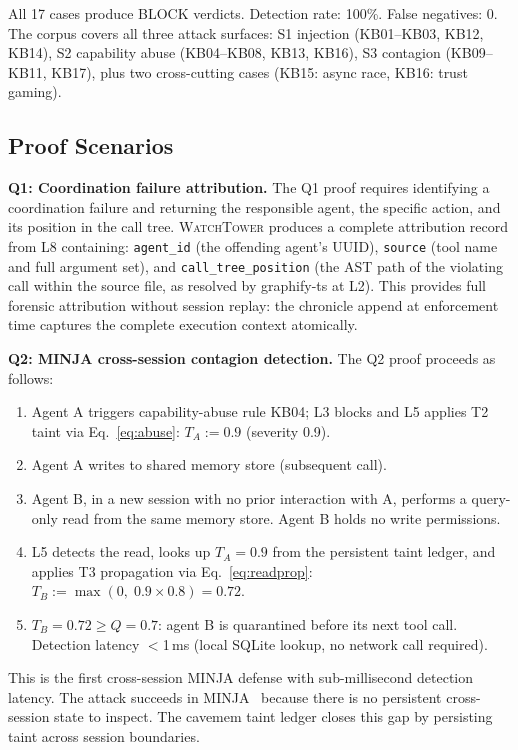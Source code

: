 \documentclass[conference]{IEEEtran}
\begin{document}
All 17 cases produce BLOCK verdicts. Detection rate: 100\%. False
negatives: 0. The corpus covers all three attack surfaces: S1 injection
(KB01--KB03, KB12, KB14), S2 capability abuse (KB04--KB08, KB13, KB16),
S3 contagion (KB09--KB11, KB17), plus two cross-cutting cases
(KB15: async race, KB16: trust gaming).

\subsection{Proof Scenarios}

\textbf{Q1: Coordination failure attribution.}
The Q1 proof requires identifying a coordination failure and returning the
responsible agent, the specific action, and its position in the call tree.
\textsc{WatchTower} produces a complete attribution record from L8
containing: \texttt{agent\_id} (the offending agent's UUID),
\texttt{source} (tool name and full argument set), and
\texttt{call\_tree\_position} (the AST path of the violating call within
the source file, as resolved by graphify-ts at L2). This provides full
forensic attribution without session replay: the chronicle append at
enforcement time captures the complete execution context atomically.

\textbf{Q2: MINJA cross-session contagion detection.}
The Q2 proof proceeds as follows:

\begin{enumerate}
\item Agent A triggers capability-abuse rule KB04; L3 blocks and L5
      applies T2 taint via Eq.~\ref{eq:abuse}: $T_A := 0.9$ (severity 0.9).
\item Agent A writes to shared memory store (subsequent call).
\item Agent B, in a new session with no prior interaction with A,
      performs a query-only read from the same memory store.
      Agent B holds no write permissions.
\item L5 detects the read, looks up $T_A = 0.9$ from the persistent
      taint ledger, and applies T3 propagation via Eq.~\ref{eq:readprop}:
      $T_B := \max(0,\; 0.9 \times 0.8) = 0.72$.
\item $T_B = 0.72 \geq Q = 0.7$: agent B is quarantined before its next
      tool call. Detection latency $<$1\,ms (local SQLite lookup,
      no network call required).
\end{enumerate}

This is the first cross-session MINJA defense with sub-millisecond
detection latency. The attack succeeds in MINJA~\cite{minja2025} because
there is no persistent cross-session state to inspect. The cavemem taint
ledger closes this gap by persisting taint across session boundaries.
\end{document}
